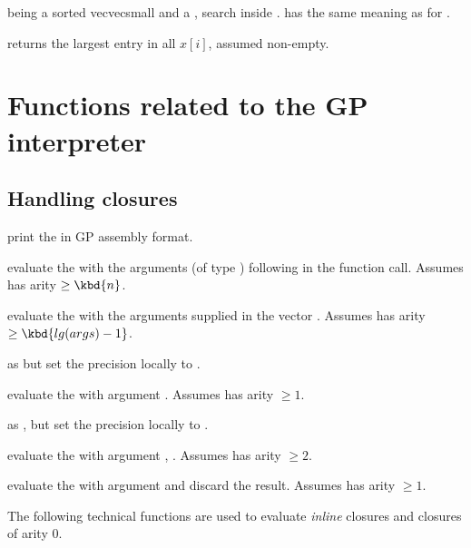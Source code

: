   being a sorted
vecvecsmall and  a , search  inside .
 has the same meaning as for .

 returns the largest entry in all $x[i]$,
assumed non-empty.

\newpage
\chapter{Functions related to the GP interpreter}

\section{Handling closures}\label{se:closure}


 print the   in
GP assembly format.

 evaluate the 
 with the  arguments (of type ) following  in
the function call. Assumes  has arity $\geq \kbd{n}$.

 evaluate the 
 with the arguments supplied in the vector . Assumes 
has arity $\geq \kbd{lg(args)-1}$.

 as
 but set the precision locally to .

 evaluate the 
 with argument . Assumes  has arity $\geq 1$.

 as
, but set the precision locally to .

 evaluate the 
 with argument , . Assumes  has arity $\geq 2$.

 evaluate the 
 with argument  and discard the result. Assumes 
has arity $\geq 1$.

The following technical functions are used to evaluate \emph{inline}
closures and closures of arity 0.

